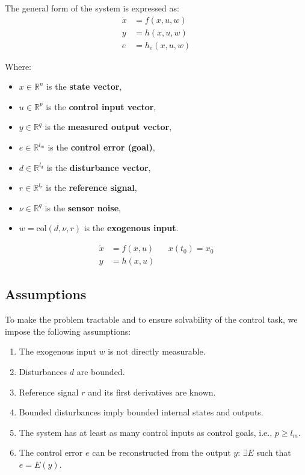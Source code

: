 \documentclass[]{report}
\begin{document}
	The general form of the system is expressed as:
	\begin{align}
		\dot{x} &= f(x, u, w) \\
		y &= h(x, u, w) \\
		e &= h_e(x, u, w)
	\end{align}
	
	Where:
	\begin{itemize}
		\item $x \in \mathbb{R}^n$ is the \textbf{state vector},
		\item $u \in \mathbb{R}^p$ is the \textbf{control input vector},
		\item $y \in \mathbb{R}^q$ is the \textbf{measured output vector},
		\item $e \in \mathbb{R}^{l_m}$ is the \textbf{control error (goal)},
		\item $d \in \mathbb{R}^{l_d}$ is the \textbf{disturbance vector},
		\item $r \in \mathbb{R}^{l_r}$ is the \textbf{reference signal},
		\item $\nu \in \mathbb{R}^q$ is the \textbf{sensor noise},
		\item $w = \text{col}(d, \nu, r)$ is the \textbf{exogenous input}.
	\end{itemize}
	\begin{equation}
		\label{eq:FormulaA}
		\begin{aligned}
			\dot{x} &= f(x,u) && x(t_0) = x_0
			\\
			y &= h(x,u)
		\end{aligned}
	\end{equation}
	\subsection*{Assumptions}
	
	To make the problem tractable and to ensure solvability of the control task, we impose the following assumptions:
	
	\begin{enumerate}
		\item The exogenous input $w$ is not directly measurable.
		\item Disturbances $d$ are bounded.
		\item Reference signal $r$ and its first derivatives are known.
		\item Bounded disturbances imply bounded internal states and outputs.
		\item The system has at least as many control inputs as control goals, i.e., $p \geq l_m$.
		\item The control error $e$ can be reconstructed from the output $y$: $\exists E$ such that $e = E(y)$.
	\end{enumerate}
	
\end{document}
